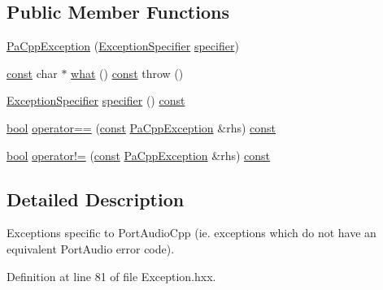 \subsection*{Public Member Functions}
\begin{DoxyCompactItemize}
\item 
\hyperlink{classportaudio_1_1_pa_cpp_exception_a5b23cefeab809dcf34b134330b3ede36}{Pa\+Cpp\+Exception} (\hyperlink{classportaudio_1_1_pa_cpp_exception_aa6c1263b3c7addf88222904aff9bdbfa}{Exception\+Specifier} \hyperlink{classportaudio_1_1_pa_cpp_exception_a5854c4c7bdd7e32503a5466d0401498c}{specifier})
\item 
\hyperlink{getopt1_8c_a2c212835823e3c54a8ab6d95c652660e}{const} char $\ast$ \hyperlink{classportaudio_1_1_pa_cpp_exception_a2c9c4deeaf496ca764f763f23a80f60e}{what} () \hyperlink{getopt1_8c_a2c212835823e3c54a8ab6d95c652660e}{const}   throw ()
\item 
\hyperlink{classportaudio_1_1_pa_cpp_exception_aa6c1263b3c7addf88222904aff9bdbfa}{Exception\+Specifier} \hyperlink{classportaudio_1_1_pa_cpp_exception_a5854c4c7bdd7e32503a5466d0401498c}{specifier} () \hyperlink{getopt1_8c_a2c212835823e3c54a8ab6d95c652660e}{const} 
\item 
\hyperlink{mac_2config_2i386_2lib-src_2libsoxr_2soxr-config_8h_abb452686968e48b67397da5f97445f5b}{bool} \hyperlink{classportaudio_1_1_pa_cpp_exception_ac8b9797a31c3e14f95d7a7d855112b90}{operator==} (\hyperlink{getopt1_8c_a2c212835823e3c54a8ab6d95c652660e}{const} \hyperlink{classportaudio_1_1_pa_cpp_exception}{Pa\+Cpp\+Exception} \&rhs) \hyperlink{getopt1_8c_a2c212835823e3c54a8ab6d95c652660e}{const} 
\item 
\hyperlink{mac_2config_2i386_2lib-src_2libsoxr_2soxr-config_8h_abb452686968e48b67397da5f97445f5b}{bool} \hyperlink{classportaudio_1_1_pa_cpp_exception_acb800fd3786be20fd83bb0d7c2fb150c}{operator!=} (\hyperlink{getopt1_8c_a2c212835823e3c54a8ab6d95c652660e}{const} \hyperlink{classportaudio_1_1_pa_cpp_exception}{Pa\+Cpp\+Exception} \&rhs) \hyperlink{getopt1_8c_a2c212835823e3c54a8ab6d95c652660e}{const} 
\end{DoxyCompactItemize}


\subsection{Detailed Description}
Exceptions specific to Port\+Audio\+Cpp (ie. exceptions which do not have an equivalent Port\+Audio error code). 

Definition at line 81 of file Exception.\+hxx.



